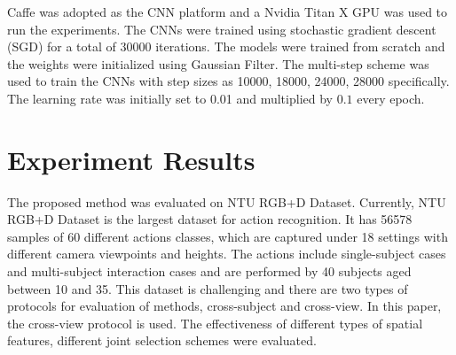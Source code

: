 \documentclass[5pt]{article}
\begin{document}
      Caffe was adopted as the CNN platform and a Nvidia Titan X GPU was used to 
run the experiments. The CNNs were trained using stochastic gradient descent 
(SGD) for a total of 30000 iterations. The models were trained from scratch and 
the weights were initialized using Gaussian Filter. The multi-step scheme was 
used to train the CNNs with step sizes as 10000, 18000, 24000, 28000 
specifically. The learning rate was initially set to 0.01 and multiplied by 
$0.1$ every epoch. 	
      
      
      \section{Experiment Results}
      \label{sec:experiment}
      The proposed method was evaluated on NTU RGB+D Dataset. Currently, NTU 
RGB+D Dataset \cite{Shahroudy2016} is the largest dataset for action 
recognition. It has 56578 samples of 60 different actions classes, which are 
captured under 18 settings with different camera viewpoints and heights. The 
actions include single-subject cases and multi-subject interaction cases and are 
performed by 40 subjects aged between 10 and 35. This dataset is challenging and 
there are two types of protocols for evaluation of methods, cross-subject and 
cross-view. In this paper, the cross-view protocol is used. The effectiveness of
different types of spatial features, different joint selection schemes were 
evaluated. 
      
\end{document}
